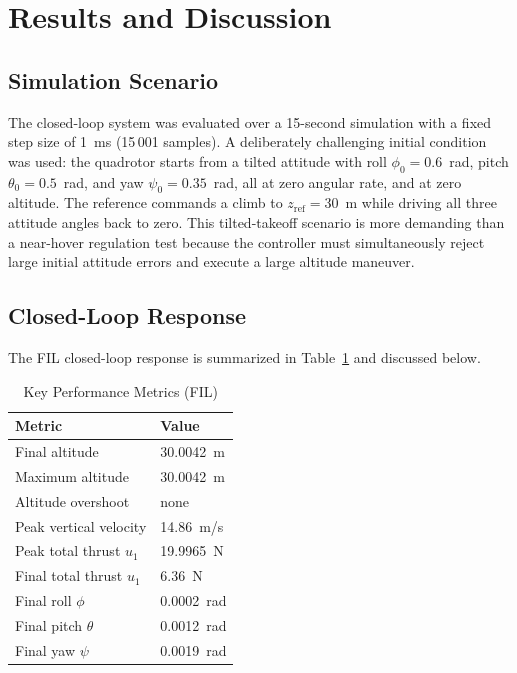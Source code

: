 \documentclass[conference]{IEEEtran}
\begin{document}
\section{Results and Discussion}
\subsection{Simulation Scenario}
The closed-loop system was evaluated over a 15-second simulation with a fixed step size of 1~ms (15\,001 samples). A deliberately challenging initial condition was used: the quadrotor starts from a tilted attitude with roll $\phi_0 = 0.6$~rad, pitch $\theta_0 = 0.5$~rad, and yaw $\psi_0 = 0.35$~rad, all at zero angular rate, and at zero altitude. The reference commands a climb to $z_{\text{ref}} = 30$~m while driving all three attitude angles back to zero. This tilted-takeoff scenario is more demanding than a near-hover regulation test because the controller must simultaneously reject large initial attitude errors and execute a large altitude maneuver.

\subsection{Closed-Loop Response}
The FIL closed-loop response is summarized in Table~\ref{tab:metrics} and discussed below.

\begin{table}[!t]
\renewcommand{\arraystretch}{1.3}
\caption{Key Performance Metrics (FIL)}
\label{tab:metrics}
\centering
\begin{tabular}{ll}
\toprule
\textbf{Metric} & \textbf{Value}\\
\midrule
Final altitude & 30.0042~m\\
Maximum altitude & 30.0042~m\\
Altitude overshoot & none\\
Peak vertical velocity & 14.86~m/s\\
Peak total thrust $u_1$ & 19.9965~N\\
Final total thrust $u_1$ & 6.36~N\\
Final roll $\phi$ & 0.0002~rad\\
Final pitch $\theta$ & 0.0012~rad\\
Final yaw $\psi$ & 0.0019~rad\\
\bottomrule
\end{tabular}
\end{table}
\end{document}
